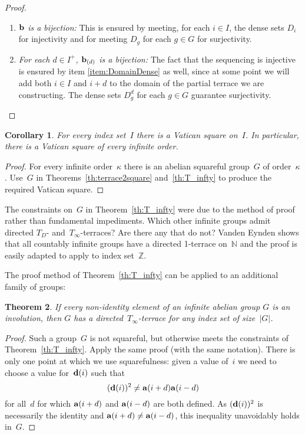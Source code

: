 \documentclass[12pt,a4paper]{article}
\newtheorem{thm}{Theorem}[section]
\newtheorem{cor}[thm]{Corollary}
\newcommand{\Z}{\mathbb{Z}}
\newcommand{\N}{\mathbb{N}}
\renewcommand{\a}{\textup{\textbf{a}}}
\renewcommand{\b}{\textup{\textbf{b}}}
\renewcommand{\d}{\textup{\textbf{d}}}
\begin{document}
\begin{proof}
\begin{enumerate}
	\item \emph{$\b$ is a bijection:} This is ensured by meeting, for each $i \in I$, the dense sets $D_i$ for injectivity and for meeting $D_g$ for each $g \in G$ for surjectivity.
	\item \emph{For each $d \in I^+$, $\b_{(d)}$ is a bijection:} The fact that the sequencing is injective is ensured by item \ref{item:DomainDense} as well, since at some point we will add both $i \in I$ and $i+d$ to the domain of the partial terrace we are constructing. The dense sets $D^d_g$ for each $g \in G$ guarantee surjectivity. \qedhere
\end{enumerate}
\end{proof}


\begin{cor}\label{cor:vatsquares}
For every index set~$I$ there is a Vatican square on~$I$.  In particular, there is a Vatican square of every infinite order.
\end{cor}

\begin{proof}
For every infinite order~$\kappa$ there is an abelian squareful group~$G$ of order~$\kappa$. Use~$G$ in Theorems~\ref{th:terrace2square} and~\ref{th:T_infty} to produce the required Vatican square.
\end{proof}

The constraints on~$G$ in Theorem~\ref{th:T_infty} were due to the method of proof rather than fundamental impediments.  Which other  infinite groups admit directed $T_D$- and~$T_{\infty}$-terraces?  Are there any that do not?  Vanden Eynden shows that all countably infinite groups have a directed 1-terrace on~$\N$ \cite{VE78} and the proof is easily adapted to apply to index set~$\Z$.  

The proof method of Theorem~\ref{th:T_infty} can be applied to an additional family of groups:

\begin{thm}\label{th:allinv}
If every non-identity element of an infinite abelian group $G$ is an involution, then $G$ has a directed~$T_{\infty}$-terrace for any index set of size~$|G|$. 
\end{thm}

\begin{proof}
Such a group~$G$ is not squareful, but otherwise meets the constraints of Theorem~\ref{th:T_infty}.  Apply the same proof (with the same notation).  There is only one point at which we use squarefulness: given a value of~$i$ we need to choose a value for~${\bf d}(i)$ such that
$$(\d(i))^2 \neq \a(i+d)\a(i-d)$$
for all~$d$ for which $\a(i+d)$ and $\a(i-d)$ are both defined.  As $(\d(i))^2$ is necessarily the identity and $\a(i+d) \neq \a(i-d)$, this inequality unavoidably holds in~$G$.
\end{proof}
\end{document}
